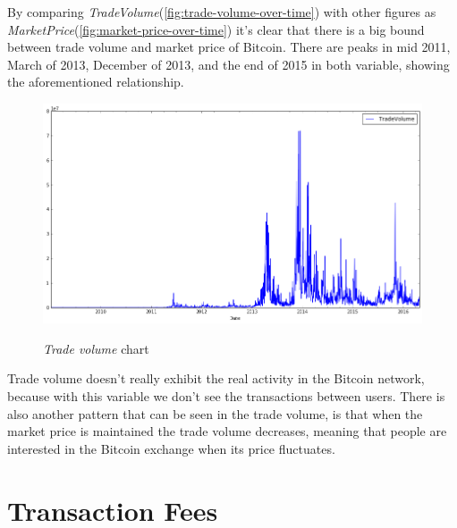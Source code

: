 By comparing
\textit{TradeVolume}(\autoref{fig:trade-volume-over-time}) with other
figures as \textit{MarketPrice}(\autoref{fig:market-price-over-time})
it's clear that there is a big bound between trade volume and market
price of Bitcoin. There are peaks in mid 2011, March of 2013, December
of 2013, and the end of 2015 in both variable, showing the
aforementioned relationship.

\begin{figure}[bth]
  \myfloatalign
  {\includegraphics[width=1\linewidth]
    {gfx/trade-volume-over-time}}
  \caption{\textit{Trade volume}
    chart}
  \label{fig:trade-volume-over-time}
\end{figure}

Trade volume doesn't really exhibit the real activity in the Bitcoin
network, because with this variable we don't see the transactions
between users. There is also another pattern that can be seen in the
trade volume, is that when the market price is maintained the trade
volume decreases, meaning that people are interested in the Bitcoin
exchange when its price fluctuates.


\section{Transaction Fees}
\label{sec:transaction-fees}

